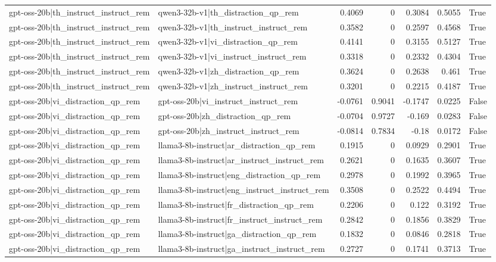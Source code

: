 \begin{table}
\begin{tabular}{l l r r r r l}
gpt-oss-20b|th_instruct_instruct_rem & qwen3-32b-v1|th_distraction_qp_rem & 0.4069 & 0 & 0.3084 & 0.5055 & True \\
gpt-oss-20b|th_instruct_instruct_rem & qwen3-32b-v1|th_instruct_instruct_rem & 0.3582 & 0 & 0.2597 & 0.4568 & True \\
gpt-oss-20b|th_instruct_instruct_rem & qwen3-32b-v1|vi_distraction_qp_rem & 0.4141 & 0 & 0.3155 & 0.5127 & True \\
gpt-oss-20b|th_instruct_instruct_rem & qwen3-32b-v1|vi_instruct_instruct_rem & 0.3318 & 0 & 0.2332 & 0.4304 & True \\
gpt-oss-20b|th_instruct_instruct_rem & qwen3-32b-v1|zh_distraction_qp_rem & 0.3624 & 0 & 0.2638 & 0.461 & True \\
gpt-oss-20b|th_instruct_instruct_rem & qwen3-32b-v1|zh_instruct_instruct_rem & 0.3201 & 0 & 0.2215 & 0.4187 & True \\
gpt-oss-20b|vi_distraction_qp_rem & gpt-oss-20b|vi_instruct_instruct_rem & -0.0761 & 0.9041 & -0.1747 & 0.0225 & False \\
gpt-oss-20b|vi_distraction_qp_rem & gpt-oss-20b|zh_distraction_qp_rem & -0.0704 & 0.9727 & -0.169 & 0.0283 & False \\
gpt-oss-20b|vi_distraction_qp_rem & gpt-oss-20b|zh_instruct_instruct_rem & -0.0814 & 0.7834 & -0.18 & 0.0172 & False \\
gpt-oss-20b|vi_distraction_qp_rem & llama3-8b-instruct|ar_distraction_qp_rem & 0.1915 & 0 & 0.0929 & 0.2901 & True \\
gpt-oss-20b|vi_distraction_qp_rem & llama3-8b-instruct|ar_instruct_instruct_rem & 0.2621 & 0 & 0.1635 & 0.3607 & True \\
gpt-oss-20b|vi_distraction_qp_rem & llama3-8b-instruct|eng_distraction_qp_rem & 0.2978 & 0 & 0.1992 & 0.3965 & True \\
gpt-oss-20b|vi_distraction_qp_rem & llama3-8b-instruct|eng_instruct_instruct_rem & 0.3508 & 0 & 0.2522 & 0.4494 & True \\
gpt-oss-20b|vi_distraction_qp_rem & llama3-8b-instruct|fr_distraction_qp_rem & 0.2206 & 0 & 0.122 & 0.3192 & True \\
gpt-oss-20b|vi_distraction_qp_rem & llama3-8b-instruct|fr_instruct_instruct_rem & 0.2842 & 0 & 0.1856 & 0.3829 & True \\
gpt-oss-20b|vi_distraction_qp_rem & llama3-8b-instruct|ga_distraction_qp_rem & 0.1832 & 0 & 0.0846 & 0.2818 & True \\
gpt-oss-20b|vi_distraction_qp_rem & llama3-8b-instruct|ga_instruct_instruct_rem & 0.2727 & 0 & 0.1741 & 0.3713 & True \\

\end{tabular}
\end{table}
